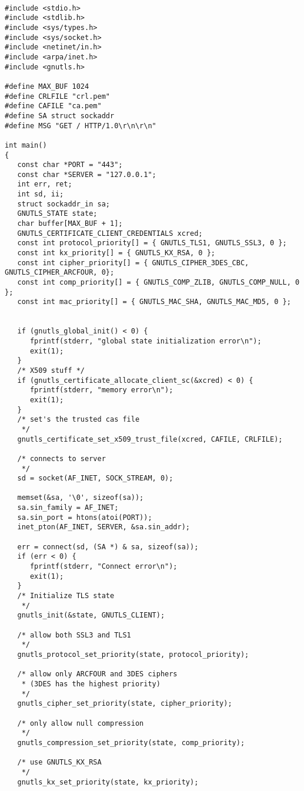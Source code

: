 \begin{verbatim}

#include <stdio.h>
#include <stdlib.h>
#include <sys/types.h>
#include <sys/socket.h>
#include <netinet/in.h>
#include <arpa/inet.h>
#include <gnutls.h>

#define MAX_BUF 1024
#define CRLFILE "crl.pem"
#define CAFILE "ca.pem"
#define SA struct sockaddr
#define MSG "GET / HTTP/1.0\r\n\r\n"

int main()
{
   const char *PORT = "443";
   const char *SERVER = "127.0.0.1";
   int err, ret;
   int sd, ii;
   struct sockaddr_in sa;
   GNUTLS_STATE state;
   char buffer[MAX_BUF + 1];
   GNUTLS_CERTIFICATE_CLIENT_CREDENTIALS xcred;
   const int protocol_priority[] = { GNUTLS_TLS1, GNUTLS_SSL3, 0 };
   const int kx_priority[] = { GNUTLS_KX_RSA, 0 };
   const int cipher_priority[] = { GNUTLS_CIPHER_3DES_CBC, GNUTLS_CIPHER_ARCFOUR, 0};
   const int comp_priority[] = { GNUTLS_COMP_ZLIB, GNUTLS_COMP_NULL, 0 };
   const int mac_priority[] = { GNUTLS_MAC_SHA, GNUTLS_MAC_MD5, 0 };


   if (gnutls_global_init() < 0) {
      fprintf(stderr, "global state initialization error\n");
      exit(1);
   }
   /* X509 stuff */
   if (gnutls_certificate_allocate_client_sc(&xcred) < 0) {  
      fprintf(stderr, "memory error\n");
      exit(1);
   }
   /* set's the trusted cas file
    */
   gnutls_certificate_set_x509_trust_file(xcred, CAFILE, CRLFILE);

   /* connects to server 
    */
   sd = socket(AF_INET, SOCK_STREAM, 0);

   memset(&sa, '\0', sizeof(sa));
   sa.sin_family = AF_INET;
   sa.sin_port = htons(atoi(PORT));
   inet_pton(AF_INET, SERVER, &sa.sin_addr);

   err = connect(sd, (SA *) & sa, sizeof(sa));
   if (err < 0) {
      fprintf(stderr, "Connect error\n");
      exit(1);
   }
   /* Initialize TLS state 
    */
   gnutls_init(&state, GNUTLS_CLIENT);

   /* allow both SSL3 and TLS1
    */
   gnutls_protocol_set_priority(state, protocol_priority);

   /* allow only ARCFOUR and 3DES ciphers
    * (3DES has the highest priority)
    */
   gnutls_cipher_set_priority(state, cipher_priority);

   /* only allow null compression
    */
   gnutls_compression_set_priority(state, comp_priority);

   /* use GNUTLS_KX_RSA
    */
   gnutls_kx_set_priority(state, kx_priority);


\end{verbatim}
